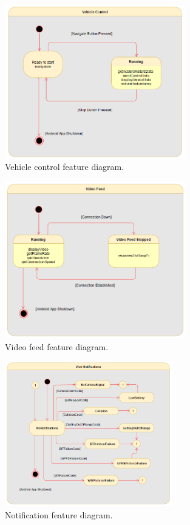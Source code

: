 \begin{figure}[!ht]
\centering
\includegraphics[width=0.7\textwidth]{img/vehicle_control_sm.png}
\caption{\label{fig:vehicle_control_diagram}Vehicle control feature diagram.}
\end{figure}
%
\begin{figure}[!ht]
\centering
\includegraphics[width=0.7\textwidth]{img/video_feed_sm.png}
\caption{\label{fig:video_feed_diagram}Video feed feature diagram.}
\end{figure}
%
\begin{figure}[!ht]
\centering
\includegraphics[width=0.65\textwidth]{img/notification_sm.png}
\caption{\label{fig:notification_diagram}Notification feature diagram.}
\end{figure}
%
